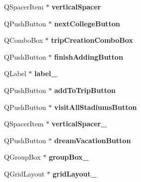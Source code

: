 \begin{DoxyCompactItemize}
Q\+Spacer\+Item $\ast$ {\bfseries vertical\+Spacer}
\item 
\mbox{\label{class_ui___main_window_a98783c8613f3d9744c49b7ce6d7c4165}} 
Q\+Push\+Button $\ast$ {\bfseries next\+College\+Button}
\item 
\mbox{\label{class_ui___main_window_a450c35ad9de95e76da29505333ec9c91}} 
Q\+Combo\+Box $\ast$ {\bfseries trip\+Creation\+Combo\+Box}
\item 
\mbox{\label{class_ui___main_window_a7e2c4661ff5eded869c48791ad84c9ca}} 
Q\+Push\+Button $\ast$ {\bfseries finish\+Adding\+Button}
\item 
\mbox{\label{class_ui___main_window_a0376fd90247280e7c7957cc70628708c}} 
Q\+Label $\ast$ {\bfseries label\+\_}
\item 
\mbox{\label{class_ui___main_window_a415e06ab91298a44aaca7314f523af43}} 
Q\+Push\+Button $\ast$ {\bfseries add\+To\+Trip\+Button}
\item 
\mbox{\label{class_ui___main_window_a4ae8e48c0c97b0b29a30b91aca1be7da}} 
Q\+Push\+Button $\ast$ {\bfseries visit\+All\+Stadiums\+Button}
\item 
\mbox{\label{class_ui___main_window_a298e82ba0cc2500cd61f393f493e4529}} 
Q\+Spacer\+Item $\ast$ {\bfseries vertical\+Spacer\+\_}
\item 
\mbox{\label{class_ui___main_window_ae6d7bd3e8107aa8ce0aa3f1381d20084}} 
Q\+Push\+Button $\ast$ {\bfseries dream\+Vacation\+Button}
\item 
\mbox{\label{class_ui___main_window_af87dc4910dc4b3434047edbb31527969}} 
Q\+Group\+Box $\ast$ {\bfseries group\+Box\+\_}
\item 
\mbox{\label{class_ui___main_window_a0bdc0d6ee9d3d95f58c53d84871f82b9}} 
Q\+Grid\+Layout $\ast$ {\bfseries grid\+Layout\+\_}
\item 
\mbox{\label{class_ui___main_window_acdff0826006698f82a7ef284f2950409}} 

\end{DoxyCompactItemize}
